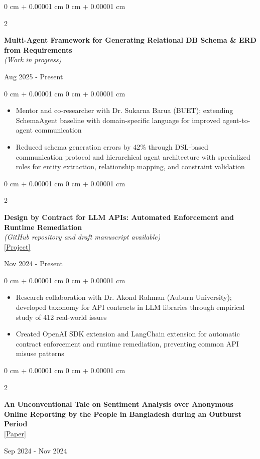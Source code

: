 \documentclass[10pt, letterpaper]{article}
\newenvironment{highlights}{
    \begin{itemize}[
        topsep=0.10 cm,
        parsep=0.10 cm,
        partopsep=0pt,
        itemsep=0pt,
        leftmargin=0 cm + 10pt
    ]
}{
    \end{itemize}
} %
\newenvironment{onecolentry}{
    \begin{adjustwidth}{
        0 cm + 0.00001 cm
    }{
        0 cm + 0.00001 cm
    }
}{
    \end{adjustwidth}
} %
\newenvironment{twocolentry}[2][]{
    \onecolentry
    \def\secondColumn{#2}
    \setcolumnwidth{\fill, 4.5 cm}
    \begin{paracol}{2}
}{
    \switchcolumn \raggedleft \secondColumn
    \end{paracol}
    \endonecolentry
} %
\begin{document}
\begin{twocolentry}{
    Aug 2025 - Present
}

\textbf{Multi-Agent Framework for Generating Relational DB Schema \& ERD from Requirements} \\
\textit{(Work in progress)}
    
\end{twocolentry}

\begin{onecolentry}
    \begin{highlights}
        \item Mentor and co-researcher with Dr. Sukarna Barua (BUET); extending SchemaAgent baseline with domain-specific language for improved agent-to-agent communication
        \item Reduced schema generation errors by 42\% through DSL-based communication protocol and hierarchical agent architecture with specialized roles for entity extraction, relationship mapping, and constraint validation
    \end{highlights}
\end{onecolentry}

\begin{twocolentry}{
    Nov 2024 - Present
}

\textbf{Design by Contract for LLM APIs: Automated Enforcement and Runtime Remediation} \\
\textit{(GitHub repository and draft manuscript available)} \\
\href{DBC_LINK_PLACEHOLDER}{[Project]}
    
\end{twocolentry}

\begin{onecolentry}
    \begin{highlights}
        \item Research collaboration with Dr. Akond Rahman (Auburn University); developed taxonomy for API contracts in LLM libraries through empirical study of 412 real-world issues
        \item Created OpenAI SDK extension and LangChain extension for automatic contract enforcement and runtime remediation, preventing common API misuse patterns
    \end{highlights}
\end{onecolentry}

    \begin{twocolentry}{Sep 2024 - Nov 2024}
    \textbf{An Unconventional Tale on Sentiment Analysis over Anonymous Online Reporting by the People in Bangladesh during an Outburst Period} \\
    \href{PAPER_LINK_PLACEHOLDER}{[Paper]}
\end{twocolentry}
\end{document}
